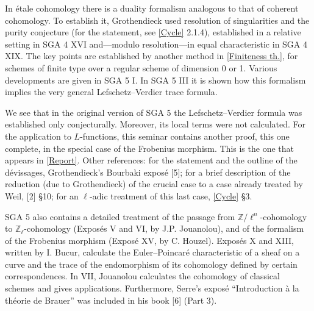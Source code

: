 In étale cohomology there is a duality formalism analogous to that of coherent
cohomology. To establish it, Grothendieck used resolution of singularities
and the purity conjecture (for the statement, see \hyperref[IV]{[Cycle]}
2.1.4), established in a relative setting in SGA 4 XVI and---modulo
resolution---in equal characteristic in SGA 4 XIX. The key points are
established by another method in \hyperref[VII]{[Finiteness th.]}, for schemes
of finite type over a regular scheme of dimension 0 or 1. Various developments
are given in SGA 5 I. In SGA 5 III it is shown how this formalism implies the
very general Lefschetz--Verdier trace formula.

We see that in the original version of SGA 5 the Lefschetz--Verdier formula
was established only conjecturally. Moreover, its local terms were not
calculated. For the application to $L$-functions, this seminar contains
another proof, this one complete, in the special case of the Frobenius
morphism. This is the one that appears in \hyperref[II]{[Report]}. Other
references: for the statement and the outline of the dévissages,
Grothendieck's Bourbaki exposé [5]; for a brief description of the reduction
(due to Grothendieck) of the crucial case to a case already treated by Weil,
[2] §10; for an $\ell$-adic treatment of this last case,
\hyperref[IV]{[Cycle]} §3.

SGA 5 also contains a detailed treatment of the passage from
$\mathbb Z/\ell^n$-cohomology to $\mathbb Z_\ell$-cohomology (Exposés V and
VI, by J.P. Jouanolou), and of the formalism of the Frobenius morphism
(Exposé XV, by C. Houzel). Exposés X
and XIII, written by I. Bucur, calculate the Euler--Poincaré characteristic
of a sheaf on a curve and the trace of the endomorphism of its cohomology
defined by certain correspondences. In VII, Jouanolou calculates the
cohomology of classical schemes and gives applications. Furthermore, Serre's
exposé ``Introduction à la théorie de Brauer'' was included in his book [6]
(Part 3).

